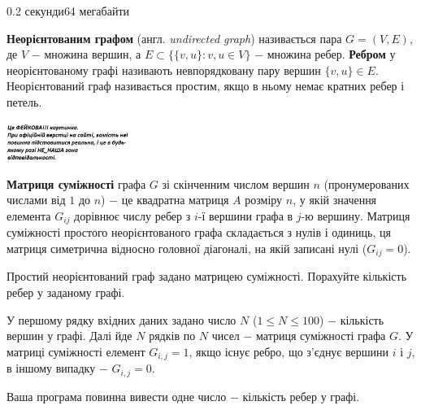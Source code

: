 \begin{problem}{}{}{}{}{0.2 секунди}{64 мегабайти}

{\bf Неорієнтованим графом} (англ. {\emph{undirected graph}}) називається пара $G=(V,E)$, де $V$ $-$ множина вершин, а $E \subset \{\{v,u\}: v,u \in V\}$ $-$ множина ребер.
{\bf Ребром} у неорієнтованому графі називають невпорядковану пару вершин $\{v,u\} \in E$.
Неорієнтований граф називається простим, якщо в ньому немає кратних ребер і петель.

 \begin{center}
 \includegraphics[width=0.30\textwidth,natwidth=232,natheight=217]{pic.png}
 \end{center}

{\bf Матриця суміжності} графа $G$ зі скінченним числом вершин $n$ (пронумерованих числами від $1$ до $n$) $-$ це квадратна матриця $A$ розміру $n$, у якій значення елемента $G_{ij}$ дорівнює числу ребер з $i$-ї вершини графа в $j$-ю вершину.
Матриця суміжності простого неорієнтованого графа складається з нулів і одиниць, 
ця матриця симетрична відносно головної діагоналі, на якій записані нулі ($G_{ij} = 0$).

Простий неорієнтований граф задано матрицею суміжності. Порахуйте кількість ребер у заданому графі.

\InputFile
У першому рядку вхідних даних задано число $N$ ($1 \le N \le 100$) $-$ кількість вершин у графі.
Далі йде $N$ рядків по $N$ чисел $-$ матриця суміжності графа $G$. У матриці суміжності елемент $G_{i,j}=1$, якщо існує ребро, що з'єднує вершини $i$ і $j$, в іншому випадку $-$ $G_{i,j}=0$.

\OutputFile
Ваша програма повинна вивести одне число $-$ кількість ребер у графі.

\Example

\begin{example}
%
\end{example}

\end{problem}

